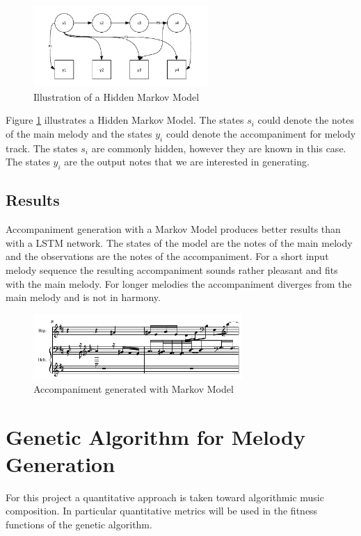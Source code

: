 \begin{figure}
\centerline{\includegraphics[width=250px]{../images/hmm_illu.pdf}}
\caption{Illustration of a Hidden Markov Model}
\label{ims:hmm_illu}
\end{figure}

Figure \ref{ims:hmm_illu} illustrates a Hidden Markov Model. The states $s_i$ could denote the notes of the main melody and the states $y_i$ could denote the accompaniment for melody track. The states $s_i$ are commonly hidden, however they are known in this case. The states $y_i$ are the output notes that we are interested in generating.

\section{Results}
Accompaniment generation with a Markov Model produces better results than with a \ac{LSTM} network. The states of the model are the notes of the main melody and the observations are the notes of the accompaniment. For a short input melody sequence the resulting accompaniment sounds rather pleasant and fits with the main melody. For longer melodies the accompaniment diverges from the main melody and is not in harmony.

\begin{figure}
\centerline{\includegraphics[width=300px]{../images/markov_model_accomp.pdf}}
\caption{Accompaniment generated with Markov Model}
\label{ims:hmm_accomp}
\end{figure}


\chapter{Genetic Algorithm for Melody Generation}

For this project a quantitative approach is taken toward algorithmic music composition. In particular quantitative metrics will be used in the fitness functions of the genetic algorithm.

